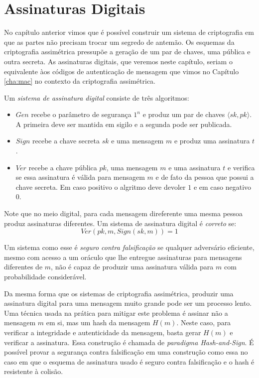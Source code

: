\chapter{Assinaturas Digitais}
\label{cha:assinaturas-digitais}

No capítulo anterior vimos que é possível construir um sistema de criptografia em que as partes não precisam trocar um segredo de antemão.
Os esquemas da criptografia assimétrica pressupõe a geração de um par de chaves, uma pública e outra secreta.
As assinaturas digitais, que veremos neste capítulo, seriam o equivalente àos códigos de autenticação de mensagem que vimos no Capítulo \ref{cha:mac} no contexto da criptografia assimétrica.

Um {\em sistema de assinatura digital} consiste de três algoritmos:
\begin{itemize}
\item $Gen$ recebe o parâmetro de segurança $1^n$ e produz um par de chaves $\langle sk, pk \rangle$. 
A primeira deve ser mantida em sigilo e a segunda pode ser publicada.
\item $Sign$ recebe a chave secreta $sk$ e uma mensagem $m$ e produz uma assinatura $t$.
\item $Ver$ recebe a chave pública $pk$, uma mensagem $m$ e uma assinatura $t$ e verifica se essa assinatura é válida para mensagem $m$ e de fato da pessoa que possui a chave secreta.
Em caso positivo o algritmo deve devoler $1$ e em caso negativo $0$. 
\end{itemize}

Note que no meio digital, para cada mensagem direferente uma mesma pessoa produz assinaturas diferentes.
Um sistema de assinatura digital é {\em correto} se:
\begin{displaymath}
  Ver(pk, m, Sign(sk, m)) = 1
\end{displaymath}
 
Um sistema como esse é {\em seguro contra falsificação} se qualquer adversário eficiente, mesmo com acesso a um oráculo que lhe entregue assinaturas para mensagens diferentes de $m$, não é capaz de produzir uma assinatura válida para $m$ com probabilidade considerável.

Da mesma forma que os sistemas de criptografia assimétrica, produzir uma assinatura digital para uma mensagem muito grande pode ser um processo lento.
Uma técnica usada na prática para mitigar este problema é assinar não a mensagem $m$ em si, mas um hash da mensagem $H(m)$.
Neste caso, para verificar a integridade e autenticidade da mensagem, basta gerar $H(m)$ e verificar a assinatura.
Essa construção é chamada de {\em paradigma Hash-and-Sign}.
É possível provar a segurança contra falsificação em uma construção como essa no caso em que o esquema de assinatura usado é seguro contra falsificação e o hash é resistente à colisão.

